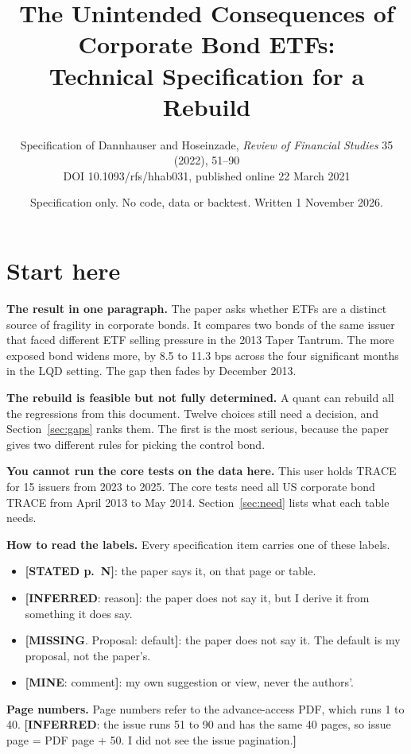 \documentclass[10pt,a4paper]{article}
\title{The Unintended Consequences of Corporate Bond ETFs:\\ Technical Specification for a Rebuild}
\author{Specification of Dannhauser and Hoseinzade, \emph{Review of Financial Studies} 35 (2022), 51--90\\
DOI 10.1093/rfs/hhab031, published online 22 March 2021}
\date{Specification only. No code, data or backtest. Written 1 November 2026.}
\newcommand{\ST}[1]{\textcolor{cst}{\textbf{[STATED #1]}}}
\newcommand{\IN}[1]{\textcolor{cin}{\textbf{[INFERRED}: #1\textbf{]}}}
\newcommand{\MI}[1]{\textcolor{cmi}{\textbf{[MISSING}. Proposal: #1\textbf{]}}}
\newcommand{\MY}[1]{\textcolor{cmy}{\textbf{[MINE}: #1\textbf{]}}}
\begin{document}
\maketitle
\tableofcontents
\newpage

\section*{Start here}

\textbf{The result in one paragraph.} The paper asks whether ETFs are a distinct source of fragility in corporate bonds. It compares two bonds of the same issuer that faced different ETF selling pressure in the 2013 Taper Tantrum. The more exposed bond widens more, by 8.5 to 11.3 bps across the four significant months in the LQD setting. The gap then fades by December 2013.

\textbf{The rebuild is feasible but not fully determined.} A quant can rebuild all the regressions from this document. Twelve choices still need a decision, and Section~\ref{sec:gaps} ranks them. The first is the most serious, because the paper gives two different rules for picking the control bond.

\textbf{You cannot run the core tests on the data here.} This user holds TRACE for 15 issuers from 2023 to 2025. The core tests need all US corporate bond TRACE from April 2013 to May 2014. Section~\ref{sec:need} lists what each table needs.

\textbf{How to read the labels.} Every specification item carries one of these labels.
\begin{itemize}
\item \ST{p.~N}: the paper says it, on that page or table.
\item \IN{reason}: the paper does not say it, but I derive it from something it does say.
\item \MI{default}: the paper does not say it. The default is my proposal, not the paper's.
\item \MY{comment}: my own suggestion or view, never the authors'.
\end{itemize}

\textbf{Page numbers.} Page numbers refer to the advance-access PDF, which runs 1 to 40. \IN{the issue runs 51 to 90 and has the same 40 pages, so issue page = PDF page + 50. I did not see the issue pagination.}
\end{document}
